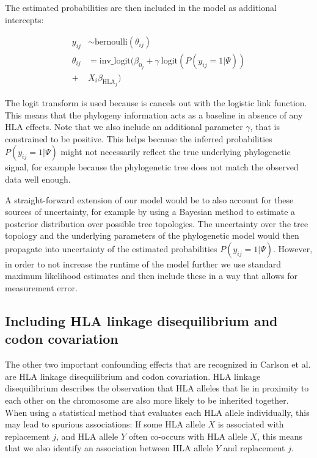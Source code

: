 \documentclass[fleqn,11pt]{SelfArx} %
\begin{document}
The estimated probabilities are then included in the model as additional intercepts:

\begin{equation}
\begin{aligned}
  y_{ij} & \sim \text{bernoulli}(\theta_{ij}) \\
  \theta_{ij} & = \text{inv\_logit}(\beta_{0_{j}} + \gamma~\text{logit}(P(y_{ij}=1|\Psi)) \\ + & X_{i}\beta_{\text{HLA}_{j}})
\end{aligned}
\end{equation}

The logit transform is used because is cancels out with the logistic link function. This means that the phylogeny information acts as a baseline in absence of any HLA effects. Note that we also include an additional parameter \(\gamma\), that is constrained to be positive. This helps because the inferred probabilities \(P(y_{ij}=1|\Psi)\) might not necessarily reflect the true underlying phylogenetic signal, for example because the phylogenetic tree does not match the observed data well enough.

A straight-forward extension of our model would be to also account for these sources of uncertainty, for example by using a Bayesian method to estimate a posterior distribution over possible tree topologies. The uncertainty over the tree topology and the underlying parameters of the phylogenetic model would then propagate into uncertainty of the estimated probabilities \(P(y_{ij}=1|\Psi)\). However, in order to not increase the runtime of the model further we  use standard maximum likelihood estimates and then include these in a way that allows for measurement error.

\subsection*{Including HLA linkage disequilibrium and codon covariation}

The other two important confounding effects that are recognized in Carlson et al.\cite{Carlson2008} are HLA linkage disequilibrium and codon covariation.
HLA linkage disequilibrium describes the observation that HLA alleles that lie in proximity to each other on the chromosome are also more likely to be inherited together. When using a statistical method that evaluates each HLA allele individually, this may lead to spurious associations: If some HLA allele \(X\) is associated with replacement \(j\), and HLA allele \(Y\) often co-occurs with HLA allele \(X\), this means that we also identify an association between HLA allele \(Y\) and replacement \(j\).
\end{document}
